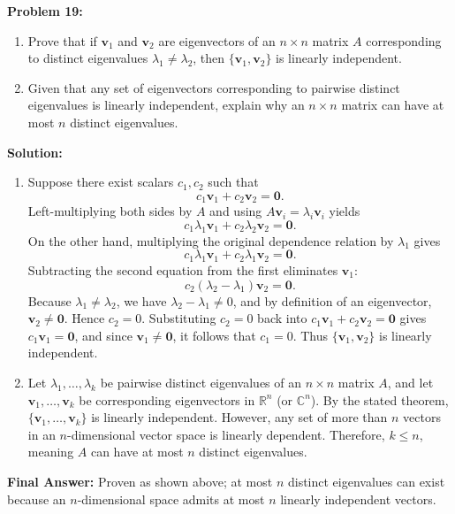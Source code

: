 \documentclass[11pt, letterpaper]{article}
\theoremstyle{definition}
\theoremstyle{remark}
\begin{document}
\textbf{Problem 19:}
\begin{enumerate}[label=(\alph*)]
    \item Prove that if $\mathbf{v}_1$ and $\mathbf{v}_2$ are eigenvectors of an $n \times n$ matrix $A$ corresponding to distinct eigenvalues $\lambda_1 \neq \lambda_2$, then $\{\mathbf{v}_1, \mathbf{v}_2\}$ is linearly independent.
    \item Given that any set of eigenvectors corresponding to pairwise distinct eigenvalues is linearly independent, explain why an $n \times n$ matrix can have at most $n$ distinct eigenvalues.
\end{enumerate}

\textbf{Solution:}
\begin{enumerate}[label=(\alph*)]
    \item Suppose there exist scalars $c_1, c_2$ such that
    \begin{equation*}
    c_1\mathbf{v}_1 + c_2\mathbf{v}_2 = \mathbf{0}.
    \end{equation*}
    Left-multiplying both sides by $A$ and using $A\mathbf{v}_i = \lambda_i\mathbf{v}_i$ yields
    \[
    c_1\lambda_1\mathbf{v}_1 + c_2\lambda_2\mathbf{v}_2 = \mathbf{0}.
    \]
    On the other hand, multiplying the original dependence relation by $\lambda_1$ gives
    \[
    c_1\lambda_1\mathbf{v}_1 + c_2\lambda_1\mathbf{v}_2 = \mathbf{0}.
    \]
    Subtracting the second equation from the first eliminates $\mathbf{v}_1$:
    \[
    c_2(\lambda_2 - \lambda_1)\mathbf{v}_2 = \mathbf{0}.
    \]
    Because $\lambda_1 \neq \lambda_2$, we have $\lambda_2 - \lambda_1 \neq 0$, and by definition of an eigenvector, $\mathbf{v}_2 \neq \mathbf{0}$. Hence $c_2 = 0$. Substituting $c_2 = 0$ back into $c_1\mathbf{v}_1 + c_2\mathbf{v}_2 = \mathbf{0}$ gives $c_1\mathbf{v}_1 = \mathbf{0}$, and since $\mathbf{v}_1 \neq \mathbf{0}$, it follows that $c_1 = 0$. Thus $\{\mathbf{v}_1, \mathbf{v}_2\}$ is linearly independent.

    \item Let $\lambda_1, \dots, \lambda_k$ be pairwise distinct eigenvalues of an $n \times n$ matrix $A$, and let $\mathbf{v}_1, \dots, \mathbf{v}_k$ be corresponding eigenvectors in $\mathbb{R}^n$ (or $\mathbb{C}^n$). By the stated theorem, $\{\mathbf{v}_1, \dots, \mathbf{v}_k\}$ is linearly independent. However, any set of more than $n$ vectors in an $n$-dimensional vector space is linearly dependent. Therefore, $k \le n$, meaning $A$ can have at most $n$ distinct eigenvalues.
\end{enumerate}
\textbf{Final Answer:} Proven as shown above; at most $n$ distinct eigenvalues can exist because an $n$-dimensional space admits at most $n$ linearly independent vectors.
\end{document}

